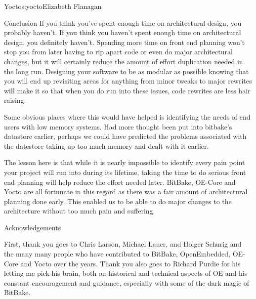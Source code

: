 \begin{aosachapter}{Yocto}{s:yocto}{Elizabeth Flanagan}
\begin{aosasect1}{Conclusion}
If you think you've spent enough time on architectural design, you
probably haven't. If you think you haven't spent enough time on
architectural design, you definitely haven't. Spending more time on
front end planning won't stop you from later having to rip apart code
or even do major architectural changes, but it will certainly reduce
the amount of effort duplication needed in the long run. Designing
your software to be as modular as possible knowing that you will end
up revisiting areas for anything from minor tweaks to major rewrites
will make it so that when you do run into these issues, code rewrites
are less hair raising.

Some obvious places where this would have helped is identifying the
needs of end users with low memory systems. Had more thought been put
into bitbake's datastore earlier, perhaps we could have predicted the
problems associated with the datestore taking up too much memory and
dealt with it earlier.

The lesson here is that while it is nearly impossible to identify
every pain point your project will run into during its lifetime,
taking the time to do serious front end planning will help reduce the
effort needed later. BitBake, OE-Core and Yocto are all fortunate in
this regard as there was a fair amount of architectural planning done
early. This enabled us to be able to do major changes to the
architecture without too much pain and suffering.

\end{aosasect1}

\begin{aosasect1}{Acknowledgements}

First, thank you goes to Chris Larson, Michael Lauer, and Holger
Schurig and the many many people who have contributed to BitBake,
OpenEmbedded, OE-Core and Yocto over the years. Thank you also goes to
Richard Purdie for his letting me pick his brain, both on historical
and technical aspects of OE and his constant encouragement and
guidance, especially with some of the dark magic of BitBake.

\end{aosasect1}

\end{aosachapter}
